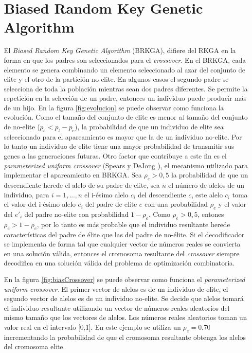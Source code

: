 \section{Biased Random Key Genetic Algorithm}\label{sec:brkga}

El \textit{Biased Random Key Genetic Algorithm} (BRKGA), difiere del RKGA en la forma en que los padres son seleccionados para el \textit{crossover}. En el BRKGA, cada elemento se genera combinando un elemento seleccionado al azar del conjunto de elite y el otro de la partición no-elite. En algunos casos el segundo padre se selecciona de toda la población mientras sean dos padres diferentes. Se permite la repetición en la selección de un padre, entonces un individuo puede producir más de un hijo. En la figura \ref{fig:evolucion} se puede observar como funciona la evolución. Como el tamaño del conjunto de elite es menor al tamaño del conjunto de no-elite ($p_e < p_t - p_e$), la probabilidad de que un individuo de elite sea seleccionado para el apareamiento es mayor que la de un individuo no-elite. Por lo tanto un individuo de elite tiene una mayor probabilidad de transmitir sus genes a las generaciones futuras. Otro factor que contribuye a este fin es el \textit{parameterized uniform crossover} (Spears y DeJong \cite{SpearsDeJong}), el mecanismo utilizado para implementar el apareamiento en BRKGA. Sea $\rho_e > 0,5$ la probabilidad de que un descendiente herede el alelo de su padre de elite, sea $n$ el número de alelos de un individuo, para $i =1,...,n$ el i-ésimo alelo $c_i$ del descendiente $c$, este alelo $c_i$ toma el valor del i-ésimo alelo $e_i$ del padre de elite $e$ con una probabilidad $\rho_e$ y el valor del $e'_i$ del padre no-elite con probabilidad $1-\rho_e$. Como $\rho_e > 0,5$, entones $\rho_e > 1 - \rho_e$, por lo tanto es más probable que el individuo resultante herede características del padre de élite que las del padre de no-élite. Si el decodificador se implementa de forma tal que cualquier vector de números reales se convierta en una solución válida, entonces el cromosoma resultante del \textit{crossover} siempre decodifica en una solución válida del problema de optimización combinatoria.

\bigskip

En la figura \ref{fig:biasCrossover} se puede observar como funciona el \textit{parameterized uniform crossover}. El primer vector de alelos es de un individuo de elite, el segundo vector de alelos es de un individuo no-elite. Se decide que alelos tomará el individuo resultante utilizando un vector de números reales aleatorios del mismo tamaño que los vectores de alelos. Los números reales aleatorios toman un valor real en el intervalo [0,1]. En este ejemplo se utiliza un $\rho_e = 0.70$ incrementando la probabilidad de que el cromosoma resultante obtenga los alelos del cromosoma elite.

